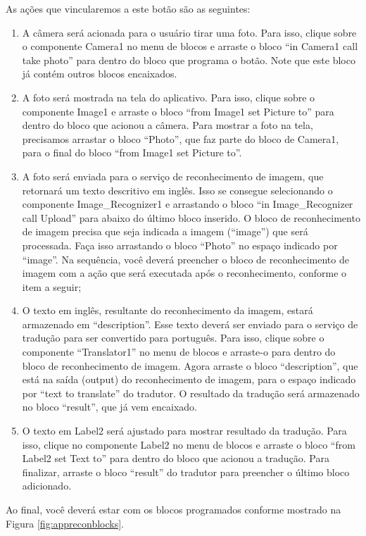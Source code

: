 \documentclass[11pt,fleqn]{book} %
\begin{document}
As ações que vincularemos a este botão são as seguintes:
\begin{enumerate}
\itemsep1em
    \item A câmera será acionada para o usuário tirar uma foto. Para isso, clique sobre o componente Camera1 no menu de blocos e arraste o bloco ``in Camera1 call take photo'' para dentro do bloco que programa o botão. Note que este bloco já contém outros blocos encaixados.
    \item A foto será mostrada na tela do aplicativo. Para isso, clique sobre o componente Image1 e arraste o bloco ``from Image1 set Picture to'' para dentro do bloco que acionou a câmera. Para mostrar a foto na tela, precisamos arrastar o bloco ``Photo'', que faz parte do bloco de Camera1, para o final do bloco ``from Image1 set Picture to''. 
    \item A foto será enviada para o serviço de reconhecimento de imagem, que retornará um texto descritivo em inglês. Isso se consegue selecionando o componente Image\_Recognizer1 e arrastando o bloco ``in Image\_Recognizer call Upload'' para abaixo do último bloco inserido. O bloco de reconhecimento de imagem precisa que seja indicada a imagem (``image'') que será processada. Faça isso arrastando o bloco ``Photo'' no espaço indicado por ``image''. Na sequência, você deverá preencher o bloco de reconhecimento de imagem com a ação que será executada após o reconhecimento, conforme o item a seguir;
    \item O texto em inglês, resultante do reconhecimento da imagem, estará armazenado em ``description''. Esse texto deverá ser enviado para o serviço de tradução para ser convertido para português. Para isso, clique sobre o componente ``Translator1'' no menu de blocos e arraste-o para dentro do bloco de reconhecimento de imagem. Agora arraste o bloco ``description'', que está na saída (output) do reconhecimento de imagem, para o espaço indicado por ``text to translate'' do tradutor. O resultado da tradução será armazenado no bloco ``result'', que já vem encaixado. 
    \item O texto em Label2 será ajustado para mostrar resultado da tradução. Para isso, clique no componente Label2 no menu de blocos e arraste o bloco ``from Label2 set Text to'' para dentro do bloco que acionou a tradução. Para finalizar, arraste o bloco ``result'' do tradutor para preencher o último bloco adicionado.
    
\end{enumerate}

Ao final, você deverá estar com os blocos programados conforme mostrado na Figura \ref{fig:appreconblocks}.
\vfill\pagebreak
\end{document}
